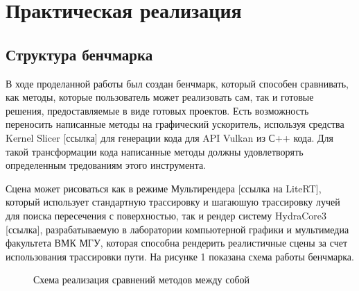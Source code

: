 \documentclass[a4paper,hidelinks,12pt]{article}
\begin{document}
\newpage

\section{Практическая реализация}

\subsection{Структура бенчмарка}

В ходе проделанной работы был создан бенчмарк, который способен сравнивать, как методы, которые пользователь может реализовать сам, так и готовые решения, 
предоставляемые в виде готовых проектов. Есть возможность переносить написанные методы на графический ускоритель, используя средства Kernel Slicer [ссылка] для генерации кода для 
API Vulkan из С++ кода. Для такой трансформации кода написанные методы должны удовлетворять определенным тредованиям этого инструмента. 

Сцена может рисоваться 
как в режиме Мультирендера [ссылка на LiteRT], который использует стандартную трассировку и шагаюшую трассировку лучей для поиска пересечения с поверхностью, так и рендер систему 
HydraCore3 [ссылка], разрабатываемую в лаборатории компьютерной графики и мультимедиа факультета ВМК МГУ, которая способна рендерить реалистичные сцены
за счет использования трассировки пути. На рисунке 1 показана схема работы бенчмарка.

\begin{figure}[h]
  \centering
  \caption{Схема реализация сравнений методов между собой}
  \label{fig:my_label}
\end{figure}
\end{document}
